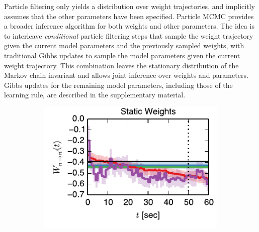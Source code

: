 Particle filtering only yields a distribution over weight trajectories, and implicitly assumes that the other parameters have been specified. Particle MCMC provides a broader inference algorithm for both weights and other parameters. The idea is to interleave \emph{conditional} particle filtering steps that sample the weight trajectory given the current model parameters and the previously sampled weights, with traditional Gibbs updates to sample the model parameters given the current weight trajectory. This combination leaves the stationary distribution of the Markov chain invariant and allows joint inference over weights and parameters.  Gibbs updates for the remaining model parameters, including those of the learning rule, are described in the supplementary material.

\begin{figure}[t]
  \centering
  \vspace{-0.5em}
  \begin{subfigure}[T]{2.4in}
    \includegraphics[width=\textwidth]{figures/ch4/fig3_static_trajectory}    
    \label{fig:fig3_static_trajectory}
  \end{subfigure}
  \begin{subfigure}[T]{1.45in}

\end{subfigure}
\end{figure}

